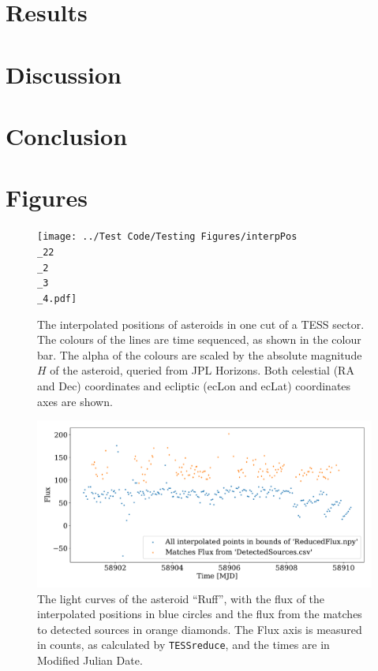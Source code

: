 \documentclass[12pt]{article}
\begin{document}
\section{Results}\label{Sec:Res}
\section{Discussion}\label{Sec:Disc}
\section{Conclusion}\label{Sec:Conc}

\section{Figures}

\begin{figure}
  \centering
  \texttt{[image: ../Test Code/Testing Figures/interpPos\\\_22\\\_2\\\_3\\\_4.pdf]}
  \caption[Interpolated positions of asteroids]{The interpolated positions of asteroids in one cut of a TESS sector.
    The colours of the lines are time sequenced, as shown in the colour bar.
    The alpha of the colours are scaled by the absolute magnitude $H$ of the asteroid, queried from JPL Horizons.
    Both celestial (RA and Dec) coordinates and ecliptic (ecLon and ecLat) coordinates axes are shown.
  }
  \label{Fig:interpPos}
\end{figure}



\begin{figure}
  \centering
  \includegraphics[width =\columnwidth]{../Test Code/Testing Figures/differentFluxes Ruff .pdf}
  \caption[Light curves of Ruff]{The light curves of the asteroid ``Ruff'', with the flux of the interpolated positions in blue circles and the flux from the matches to detected sources in orange diamonds.
    The Flux axis is measured in counts, as calculated by \texttt{TESSreduce}, and the times are in Modified Julian Date.}
  \label{Fig:DifFlux}
\end{figure}
\end{document}
